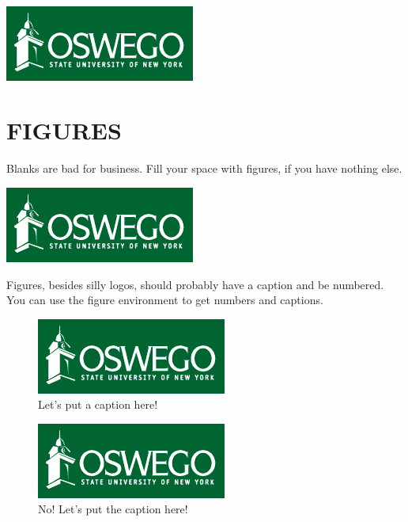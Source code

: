 \documentclass[landscape]{sciposter}
\begin{document}
\begin{multicols}{4}
\

\begin{center}
\includegraphics[scale = 2.6]{oswegologo}
\end{center}


\section{FIGURES}
Blanks are bad for business. Fill your space with figures, if you have nothing else.


\begin{center}
\includegraphics[scale=3.]{oswegologo}
\end{center}

Figures, besides silly logos, should probably have a caption and be numbered.  You can use the figure environment to get numbers and captions.

\begin{figure}
\centering
\caption{Let's put a caption here!}
\includegraphics[scale=2.7]{oswegologo}
\end{figure}

\begin{figure}
\centering
\includegraphics[scale=2.7]{oswegologo}
\caption{No! Let's put the caption here!}
\end{figure}


\end{multicols}
\end{document}

